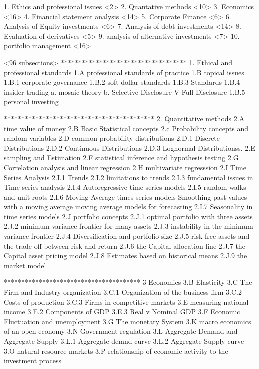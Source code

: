 1. Ethics and professional issues <2>
2. Quantative methods <10>
3. Economics <16>
4. Financial statement analysis <14>
5. Corporate Finance <6>
6. Analysis of Equity investments <6>
7. Analysis of debt investments <14>
8. Evaluation of derivatives <5>
9. analysis of alternative investments <7>
10. portfolio management <16>

<96 subsections>
************************************
1. Ethical and professional standards
1.A professional standards of practice
1.B topical issues
	1.B.1	corporate governance
	1.B.2	soft dollar standards
	1.B.3 	Standards
	1.B.4   insider trading
		a. mosaic theory
		b. Selective Disclosure V Full Disclosure
	1.B.5	personal investing

*******************************************
2. Quantitative methods
2.A time value of money
2.B Basic Statistical concepts
2.c Probability concepts and random variables
2.D common  probability distributions
	2.D.1 Discrete Distributions
	2.D.2 Continuous Distributions
	2.D.3 Lognormal Distributionss.
2.E sampling and Estimation
2.F statistical inference and hypothesis testing
2.G Correlation analysis and linear regression
2.H multivariate regresssion 
2.I Time Series Analysis
	2.I.1 Trends
	2.I.2 limitations to trends
	2.I.3 fundamental issues in Time series analysis
	2.I.4 Autoregressive time series models
	2.I.5 random walks and unit roots
	2.I.6 Moving Average times series models
		Smoothing past values with a moving average
		moving average models for forecasting
	2.I.7 Seasonality in time series models
2.J portfolio concepts
	2.J.1 optimal portfolio with three assets
	2.J.2 minimum variance frontier for many assets
	2.J.3 instability in the minimum variance frontier
	2.J.4 Diversification and portfolio size
	2.J.5 risk free assets and the trade off between risk and return
	2.J.6 the Capital allocation line
	2.J.7 the Capital asset pricing model
	2.J.8 Estimates based on historical means
	2.J.9 the market model

***************************************
3 Economics
3.B Elasticity
3.C The Firm and Industry organization
3.C.1 Organization of the business firm
3.C.2 Costs of production 
3.C.3 Firms in competitive markets
3.E measuring national income
3.E.2 Components of GDP
3.E.3 Real v Nominal GDP
3.F Economic Fluctuation and unemployment
3.G The monetary System
3.K macro economics of an open economy
3.N Government regulation
3.L Aggregate Demand and Aggregate Supply
3.L.1 Aggregate demnd curve
3.L.2 Aggregate Supply curve
3.O natural resource markets
3.P relationship of economic activity to the investment process

